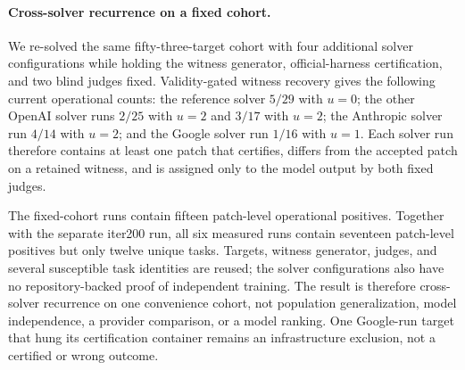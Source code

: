 \documentclass[11pt]{article}
\begin{document}
\paragraph{Cross-solver recurrence on a fixed cohort.} We re-solved the same fifty-three-target cohort with
four additional solver configurations while holding the witness generator, official-harness certification,
and two blind judges fixed. Validity-gated witness recovery gives the following current operational counts:
the reference solver $5/29$ with $u=0$; the other OpenAI solver runs $2/25$ with $u=2$ and $3/17$ with $u=2$;
the Anthropic solver run $4/14$ with $u=2$; and the Google solver run $1/16$ with $u=1$. Each solver run
therefore contains at least one patch that certifies, differs from the accepted patch on a retained witness,
and is assigned only to the model output by both fixed judges.

The fixed-cohort runs contain fifteen patch-level operational positives. Together with the separate iter200
run, all six measured runs contain seventeen patch-level positives but only twelve unique tasks. Targets,
witness generator, judges, and several susceptible task identities are reused; the solver configurations also
have no repository-backed proof of independent training. The result is therefore cross-solver recurrence on
one convenience cohort, not population generalization, model independence, a provider comparison, or a model
ranking. One Google-run target that hung its certification container remains an infrastructure exclusion, not
a certified or wrong outcome.
\end{document}
